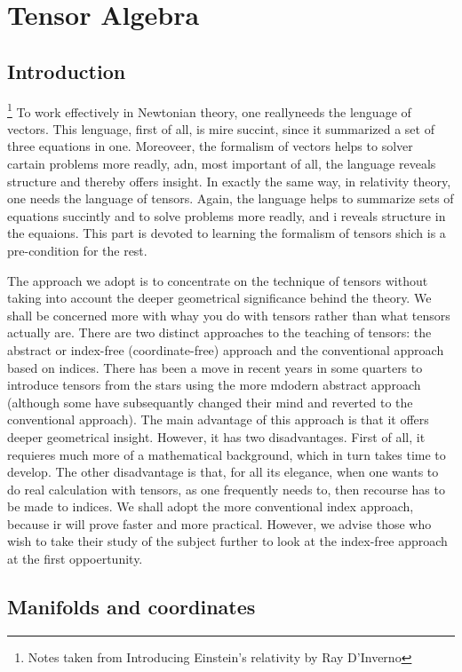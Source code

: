 \chapter{Tensor Algebra}
\section{Introduction}\footnote{Notes taken from Introducing Einstein's relativity by Ray D'Inverno}
To work effectively in Newtonian theory, one reallyneeds the lenguage of vectors. This lenguage, first of all, is mire succint, since it  summarized a set of three equations in one. Moreoveer, the formalism of vectors helps to solver cartain problems more readly, adn, most important of all, the language reveals structure and thereby offers insight. In exactly the same way, in relativity theory, one needs the language of tensors. Again, the language helps to summarize sets of equations succintly and to solve problems more readly, and i reveals structure in the equaions. This part is devoted to learning the formalism of tensors shich is a pre-condition for the rest.

The approach we adopt is to concentrate on the technique of tensors without taking into account the deeper geometrical significance behind the theory. We shall be concerned more with whay you do with tensors rather than what tensors actually are. There are two distinct approaches to the teaching of tensors: the abstract or index-free (coordinate-free) approach and the conventional approach based on indices. There has been a move in recent years in some quarters to introduce tensors from the stars using the more mdodern abstract approach (although some have subsequantly changed their mind and reverted to the conventional approach). The main advantage of this approach is that it offers deeper geometrical insight. However, it has two disadvantages. First of all, it requieres much more of a mathematical background, which in turn takes time to develop. The other disadvantage is that, for all its elegance, when one wants to do real calculation with tensors, as one frequently needs to, then recourse has to be made to indices. We shall adopt the more conventional index approach, because ir will prove faster and more practical. However, we advise those who wish to take their study of the subject further to look at the index-free approach at the first oppoertunity.

\section{Manifolds and coordinates}

